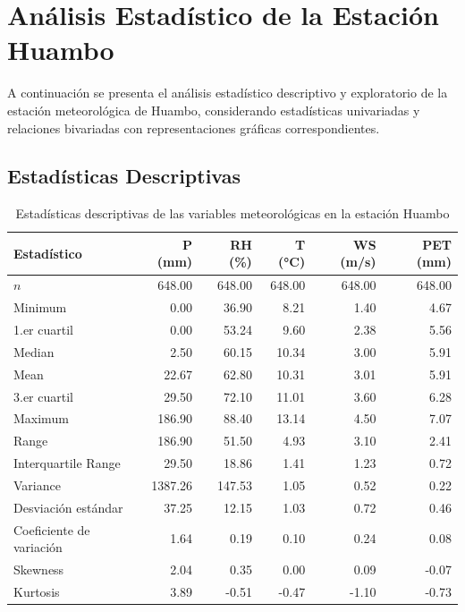 \section{Análisis Estadístico de la Estación Huambo}

A continuación se presenta el análisis estadístico descriptivo y exploratorio de la estación meteorológica de Huambo, considerando estadísticas univariadas y relaciones bivariadas con representaciones gráficas correspondientes.

\subsection{Estadísticas Descriptivas}

\begin{table}[H]
\centering
\caption{Estadísticas descriptivas de las variables meteorológicas en la estación Huambo}
\label{tab:stat_huambo}
\tiny
\begin{tabular}{lrrrrr}
\toprule
\textbf{Estadístico} & \textbf{P (mm)} & \textbf{RH (\%)} & \textbf{T (°C)} & \textbf{WS (m/s)} & \textbf{PET (mm)} \\
\midrule
$n$         & 648.00 & 648.00 & 648.00 & 648.00 & 648.00 \\
Minimum                         & 0.00   & 36.90  & 8.21   & 1.40   & 4.67   \\
1.er cuartil                 & 0.00   & 53.24  & 9.60   & 2.38   & 5.56   \\
Median                       & 2.50   & 60.15  & 10.34  & 3.00   & 5.91   \\
Mean                         & 22.67  & 62.80  & 10.31  & 3.01   & 5.91   \\
3.er cuartil                & 29.50  & 72.10  & 11.01  & 3.60   & 6.28   \\
Maximum                        & 186.90 & 88.40  & 13.14  & 4.50   & 7.07   \\
Range                         & 186.90 & 51.50  & 4.93   & 3.10   & 2.41   \\
Interquartile Range          & 29.50  & 18.86  & 1.41   & 1.23   & 0.72   \\
Variance                    & 1387.26& 147.53 & 1.05   & 0.52   & 0.22   \\
Desviación estándar           & 37.25  & 12.15  & 1.03   & 0.72   & 0.46   \\
Coeficiente de variación     & 1.64   & 0.19   & 0.10   & 0.24   & 0.08   \\
Skewness                    & 2.04   & 0.35   & 0.00   & 0.09   & -0.07  \\
Kurtosis                      & 3.89   & -0.51  & -0.47  & -1.10  & -0.73  \\
\bottomrule
\end{tabular}
\end{table}

